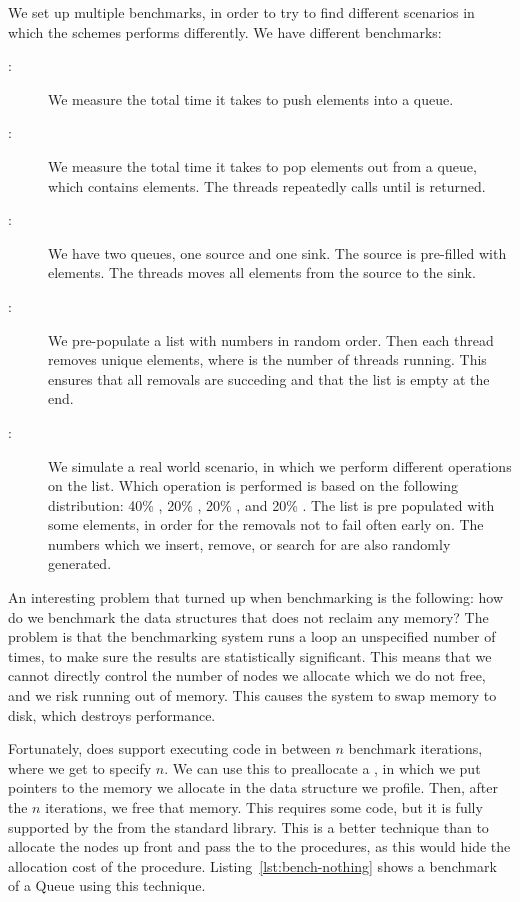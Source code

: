 \documentclass[b5paper]{report}
\begin{document}
We set up multiple benchmarks, in order to try to find different scenarios in
which the schemes performs differently. We have \todo{} different benchmarks:
\begin{description}
  \item[:] We measure the total time it takes to push 
    elements into a queue.
  \item[:] We measure the total time it takes to pop 
    elements out from a queue, which contains  elements. The threads
    repeatedly calls  until  is returned.
  \item[:] We have two queues, one source and one sink. The
    source is pre-filled with  elements. The threads moves all elements
    from the source to the sink.
  \item[:] We pre-populate a list with  numbers in
    random order. Then each thread removes  unique elements, where
     is the number of threads running. This ensures that all removals
    are succeding and that the list is empty at the end.
  \item[:] We simulate a real world scenario, in which
    we perform different operations on the list. Which operation is performed is
    based on the following distribution: 40\% , 20\% ,
    20\% , and 20\% . The list is pre populated
    with some elements, in order for the removals not to fail often early on.
    The numbers which we insert, remove, or search for are also randomly
    generated.
\end{description}

An interesting problem that turned up when benchmarking is the following: how do
we benchmark the data structures that does not reclaim any memory? The problem
is that the benchmarking system runs a loop an unspecified number of times, to
make sure the results are statistically significant. This means that we cannot directly control the number of nodes
we allocate which we do not free, and we risk running out of memory. This causes
the system to swap memory to disk, which destroys performance.

Fortunately,  does support executing code in between $n$ benchmark
iterations, where we get to specify $n$. We can use this to preallocate a
, in which we put pointers to the memory we allocate in the data
structure we profile. Then, after the $n$ iterations, we free that memory. This
requires some  code, but it is fully supported by the 
from the standard library. This is a better technique than to allocate the nodes
up front and pass the  to the procedures, as this would hide the
allocation cost of the procedure. Listing~\ref{lst:bench-nothing} shows a
benchmark of a Queue using this technique.
\end{document}
